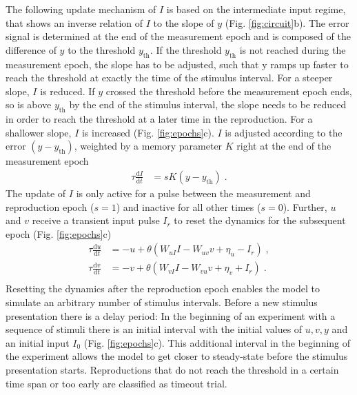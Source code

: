 \documentclass[10pt]{article}
\begin{document}
The following update mechanism of $I$ is based on the intermediate input regime, that shows an inverse relation of $I$ to the slope of $y$ (Fig. \ref{fig:circuit}b).
The error signal is determined at the end of the measurement epoch and is composed of the difference of $y$ to the threshold $y_{\text{th}}$.
If the threshold $y_{\text{th}}$ is not reached during the measurement epoch, the slope has to be adjusted, such that y ramps up faster to reach the threshold at exactly the time of the stimulus interval. For a steeper slope, $I$ is reduced.
If $y$ crossed the threshold before the measurement epoch ends, so is above $y_{\text{th}}$ by the end of the stimulus interval, the slope needs to be reduced in order to reach the threshold at a later time in the reproduction. For a shallower slope, $I$ is increased (Fig. \ref{fig:epochs}c).
$I$ is adjusted according to the error $(y-y_{\text{th}})$, weighted by a memory parameter $K$ right at the end of the measurement epoch
\begin{equation} \label{Iupdate}
	\begin{split}
	\tau\frac{\text{d}I}{\text{d}t} & = sK(y-y_{\text{th}}) \;.
	\end{split}
\end{equation}
The update of $I$ is only active for a pulse between the measurement and reproduction epoch ($s=1$) and inactive for all other times ($s=0$).
Further, $u$ and $v$ receive a transient input pulse $I_r$ to reset the dynamics for the subsequent epoch (Fig. \ref{fig:epochs}c)
\begin{equation} \label{experimentcircuit}
	\begin{split}
	\tau\frac{\text{d}u}{\text{d}t} & = -u + \theta(W_{uI}I - W_{uv}v + \eta_u - I_r) \;,\\
	\tau\frac{\text{d}v}{\text{d}t} & = -v + \theta(W_{vI}I - W_{vu}v + \eta_v + I_r) \;.\\
	\end{split}
\end{equation}
Resetting the dynamics after the reproduction epoch enables the model to simulate an arbitrary number of stimulus intervals. 
Before a new stimulus presentation there is a delay period: In the beginning of an experiment with a sequence of stimuli there is an initial interval with the initial values of $u, v, y$ and an initial input $I_0$ (Fig. \ref{fig:epochs}c). 
This additional interval in the beginning of the experiment allows the model to get closer to steady-state before the stimulus presentation starts. 
Reproductions that do not reach the threshold in a certain time span  or too early are classified as timeout trial.
\end{document}
